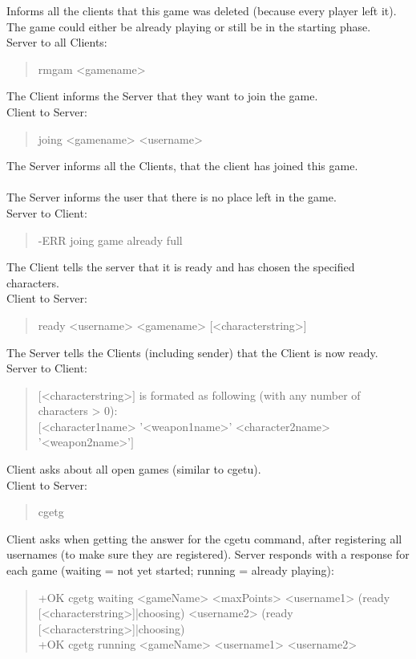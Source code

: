\documentclass[a4paper,11pt]{article}
\begin{document}
Informs all the clients that this game was deleted (because every player left it).	The game could either be already playing or still be in the starting phase.\\
Server to all Clients:
\begin{quote}
  rmgam <gamename>
\end{quote}

\noindent
The Client informs the Server that they want to join the game.\\
Client to Server:
\begin{quote}
  joing <gamename> <username>
\end{quote}

\noindent
The Server informs all the Clients, that the client has joined this game.\\\\

The Server informs the user that there is no place left in the game.\\
Server to Client:
\begin{quote}
  -ERR joing game already full
\end{quote}

\noindent
The Client tells the server that it is ready and has chosen the specified characters.\\
Client to Server:
\begin{quote}
  ready <username> <gamename> [<characterstring>]
\end{quote}

\noindent
The Server tells the Clients (including sender) that the Client is now ready.
Server to Client:
\begin{quote}
  $[$<characterstring>$]$  is formated as following (with any number of characters > 0):\\
	$[$<character1name> '<weapon1name>' <character2name> '<weapon2name>'$]$ 
\end{quote}	

\noindent
Client asks about all open games (similar to cgetu).\\
Client to Server:
\begin{quote}
  cgetg
\end{quote}

\noindent	
Client asks when getting the answer for the cgetu command, after registering all usernames (to make sure they are registered).
Server responds with a response for each game (waiting = not yet started; running = already playing):
\begin{quote}
  +OK cgetg waiting <gameName> <maxPoints> <username1> (ready [<characterstring>]|choosing) <username2> (ready [<characterstring>]|choosing)\\
  +OK cgetg running <gameName> <username1> <username2>
\end{quote}
\end{document}
